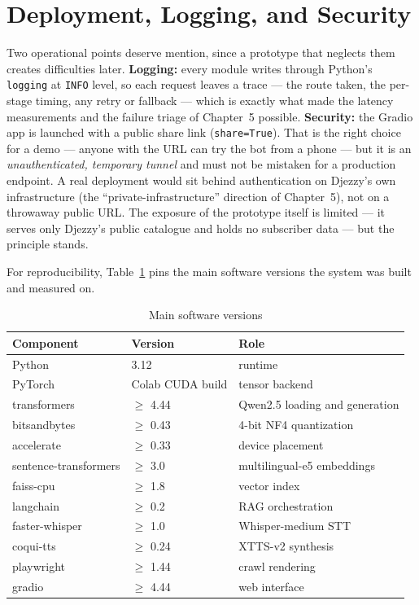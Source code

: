 \documentclass[12pt, a4paper]{report}
\newcommand{\humantext}[1]{#1}      %
\begin{document}
\section{Deployment, Logging, and Security}
\humantext{Two operational points deserve mention, since a prototype that neglects them creates difficulties later. \textbf{Logging:} every module writes through Python's \texttt{logging} at \texttt{INFO} level, so each request leaves a trace --- the route taken, the per-stage timing, any retry or fallback --- which is exactly what made the latency measurements and the failure triage of Chapter~5 possible. \textbf{Security:} the Gradio app is launched with a public share link (\texttt{share=True}). That is the right choice for a demo --- anyone with the URL can try the bot from a phone --- but it is an \emph{unauthenticated, temporary tunnel} and must not be mistaken for a production endpoint. A real deployment would sit behind authentication on Djezzy's own infrastructure (the ``private-infrastructure'' direction of Chapter~5), not on a throwaway public URL. The exposure of the prototype itself is limited --- it serves only Djezzy's public catalogue and holds no subscriber data --- but the principle stands.}

\humantext{For reproducibility, Table~\ref{tab:versions} pins the main software versions the system was built and measured on.}

\begin{table}[H]
\centering
\caption{Main software versions}
\label{tab:versions}
\begin{tabularx}{\textwidth}{l l X}
\toprule
\textbf{Component} & \textbf{Version} & \textbf{Role} \\
\midrule
Python                & 3.12             & runtime \\
PyTorch               & Colab CUDA build & tensor backend \\
transformers          & $\ge$ 4.44       & Qwen2.5 loading and generation \\
bitsandbytes          & $\ge$ 0.43       & 4-bit NF4 quantization \\
accelerate            & $\ge$ 0.33       & device placement \\
sentence-transformers & $\ge$ 3.0        & multilingual-e5 embeddings \\
faiss-cpu             & $\ge$ 1.8        & vector index \\
langchain             & $\ge$ 0.2        & RAG orchestration \\
faster-whisper        & $\ge$ 1.0        & Whisper-medium STT \\
coqui-tts             & $\ge$ 0.24       & XTTS-v2 synthesis \\
playwright            & $\ge$ 1.44       & crawl rendering \\
gradio                & $\ge$ 4.44       & web interface \\
\bottomrule
\end{tabularx}
\end{table}
\end{document}

